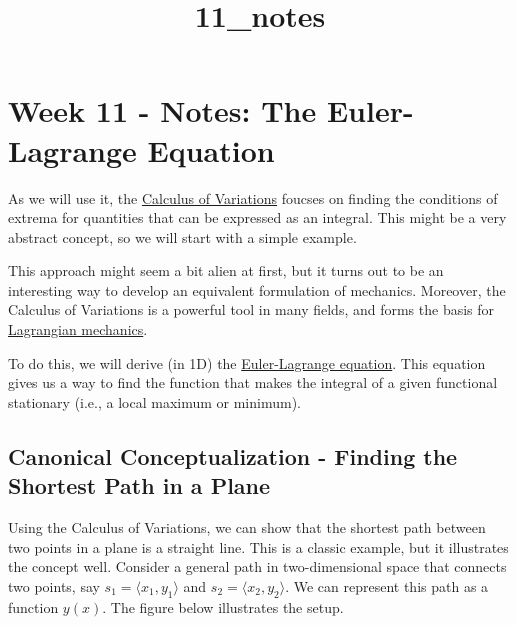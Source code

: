 \documentclass[11pt]{article}
\title{11\_notes}
\begin{document}
    
    \maketitle
    
    

    
    \section{Week 11 - Notes: The Euler-Lagrange
Equation}\label{week-11---notes-the-euler-lagrange-equation}

As we will use it, the
\href{https://en.wikipedia.org/wiki/Calculus_of_variations}{Calculus of
Variations} foucses on finding the conditions of extrema for quantities
that can be expressed as an integral. This might be a very abstract
concept, so we will start with a simple example.

This approach might seem a bit alien at first, but it turns out to be an
interesting way to develop an equivalent formulation of mechanics.
Moreover, the Calculus of Variations is a powerful tool in many fields,
and forms the basis for
\href{https://en.wikipedia.org/wiki/Lagrangian_mechanics}{Lagrangian
mechanics}.

To do this, we will derive (in 1D) the
\href{https://en.wikipedia.org/wiki/Euler\%E2\%80\%93Lagrange_equation}{Euler-Lagrange
equation}. This equation gives us a way to find the function that makes
the integral of a given functional stationary (i.e., a local maximum or
minimum).

    \subsection{Canonical Conceptualization - Finding the Shortest Path in a
Plane}\label{canonical-conceptualization---finding-the-shortest-path-in-a-plane}

Using the Calculus of Variations, we can show that the shortest path
between two points in a plane is a straight line. This is a classic
example, but it illustrates the concept well. Consider a general path in
two-dimensional space that connects two points, say
\(s_1 = \langle x_1, y_1 \rangle\) and
\(s_2 = \langle x_2, y_2 \rangle\). We can represent this path as a
function \(y(x)\). The figure below illustrates the setup.
\end{document}
